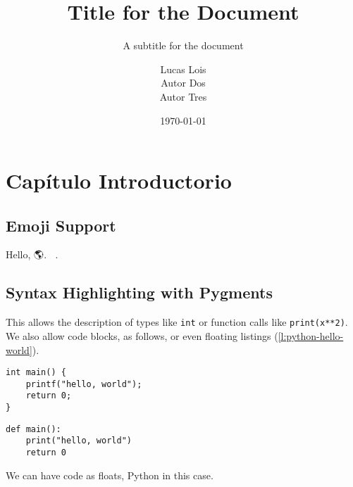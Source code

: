 \documentclass[12pt]{report}
\title{Title for the Document}
\subtitle{A subtitle for the document}
\author{
	Lucas Lois\\
	Autor Dos\\
	Autor Tres
}
\institute{Universidad Católica del Uruguay}
\date{\today}
\begin{document}

\tableofcontents
\chapter{Capítulo Introductorio}

\blindtext \parencite{coulouris}

\section{Emoji Support 🙌}

Hello, 🌎. 🚀🌝.

\section{Syntax Highlighting with Pygments}

This allows the description of types like \texttt{int} or function calls
like \texttt{print(x**2)}.
We also allow code blocks, as follows, or even floating listings
(\ref{l:python-hello-world}).

\begin{verbatim}
int main() {
    printf("hello, world");
    return 0;
}
\end{verbatim}

\blindtext

\begin{listing}
\begin{verbatim}
def main():
    print("hello, world")
    return 0
\end{verbatim}
\caption{We can have code as floats, Python in this case.}
\label{l:python-hello-world}
\end{listing}


\pagebreak
\printbibliography{}
\end{document}
